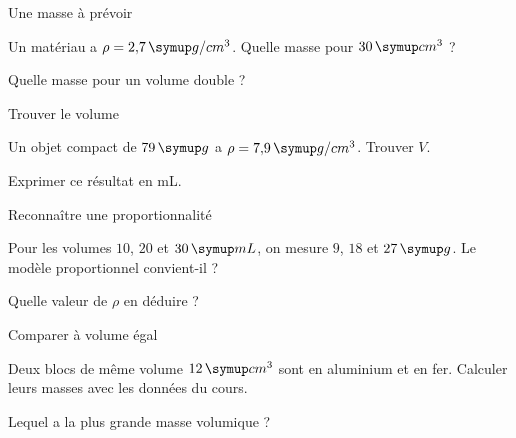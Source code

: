 \clearpage{}
\par\noindent\begin{minipage}{\linewidth}
\begin{exercice}[2]{Une masse à prévoir}
\begin{questions}
\item Un matériau a $\rho=2{,}7\unite{g/cm^3}$. Quelle masse pour $30\unite{cm^3}$ ?
\item Quelle masse pour un volume double ?
\end{questions}
\end{exercice}
\end{minipage}
\par\noindent\begin{minipage}{\linewidth}
\begin{exercice}[2]{Trouver le volume}
\begin{questions}
\item Un objet compact de $79\unite g$ a $\rho=7{,}9\unite{g/cm^3}$. Trouver $V$.
\item Exprimer ce résultat en mL.
\end{questions}
\end{exercice}
\end{minipage}
\par\noindent\begin{minipage}{\linewidth}
\begin{exercice}[2]{Reconnaître une proportionnalité}
\begin{questions}
\item Pour les volumes $10$, $20$ et $30\unite{mL}$, on mesure $9$, $18$ et $27\unite g$. Le modèle proportionnel convient-il ?
\item Quelle valeur de $\rho$ en déduire ?
\end{questions}
\end{exercice}
\end{minipage}
\par\noindent\begin{minipage}{\linewidth}
\begin{exercice}[2]{Comparer à volume égal}
\begin{questions}
\item Deux blocs de même volume $12\unite{cm^3}$ sont en aluminium et en fer. Calculer leurs masses avec les données du cours.
\item Lequel a la plus grande masse volumique ?
\end{questions}
\end{exercice}
\end{minipage}
